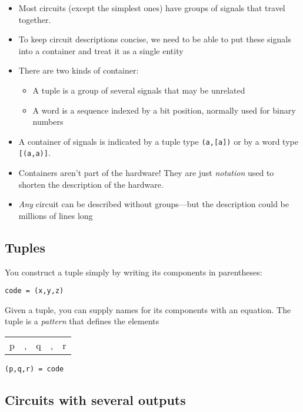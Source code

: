 \documentclass[11pt]{article}
\begin{document}
\begin{itemize}
\item Most circuits (except the simplest ones) have groups of signals
that travel together.
\item To keep circuit descriptions concise, we need to be able to put
these signals into a container and treat it as a single entity
\item There are two kinds of container:

\begin{itemize}
\item A \alert{tuple} is a group of several signals that may be
unrelated
\item A \alert{word} is a sequence indexed by a bit position,
normally used for binary numbers
\end{itemize}

\item A container of signals is indicated by a tuple type
\texttt{(a,[a])} or by a word type \texttt{[(a,a)]}.
\item Containers aren't part of the hardware!  They are just
\emph{notation} used to shorten the description of the hardware.
\item \emph{Any} circuit can be described without groups---but the
description could be millions of lines long
\end{itemize}

\subsection{Tuples}
\label{sec:orgf05b8e8}

You construct a tuple simply by writing its components in
parentheses:

\begin{verbatim}
code = (x,y,z)
\end{verbatim}

Given a tuple, you can supply names for its components with an
equation.  The tuple is a \emph{pattern} that defines the elements
\begin{center}
\begin{tabular}{lllll}
p & , & q & , & r\\[0pt]
\end{tabular}
\end{center}

\begin{verbatim}
(p,q,r) = code
\end{verbatim}

\subsection{Circuits with several outputs}
\label{sec:org36e5065}
\end{document}

